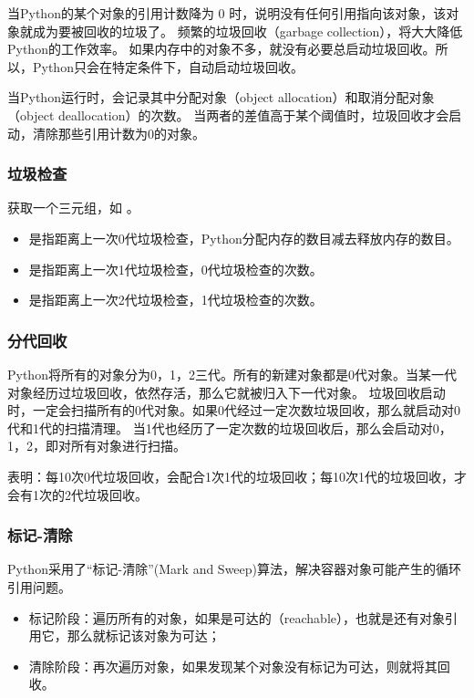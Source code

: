 \documentclass[letterpaper,10pt,english]{sphinxmanual}
\begin{document}
当Python的某个对象的引用计数降为 0 时，说明没有任何引用指向该对象，该对象就成为要被回收的垃圾了。
频繁的垃圾回收（garbage collection），将大大降低Python的工作效率。
如果内存中的对象不多，就没有必要总启动垃圾回收。所以，Python只会在特定条件下，自动启动垃圾回收。

当Python运行时，会记录其中分配对象（object allocation）和取消分配对象（object deallocation）的次数。
当两者的差值高于某个阈值时，垃圾回收才会启动，清除那些引用计数为0的对象。


\subsubsection{垃圾检查}
\label{\detokenize{python/15_memManage:id9}}
 获取一个三元组，如  。
\begin{itemize}
\item {} 
 是指距离上一次0代垃圾检查，Python分配内存的数目减去释放内存的数目。

\item {} 
 是指距离上一次1代垃圾检查，0代垃圾检查的次数。

\item {} 
 是指距离上一次2代垃圾检查，1代垃圾检查的次数。

\end{itemize}


\subsubsection{分代回收}
\label{\detokenize{python/15_memManage:id10}}
Python将所有的对象分为0，1，2三代。所有的新建对象都是0代对象。当某一代对象经历过垃圾回收，依然存活，那么它就被归入下一代对象。
垃圾回收启动时，一定会扫描所有的0代对象。如果0代经过一定次数垃圾回收，那么就启动对0代和1代的扫描清理。
当1代也经历了一定次数的垃圾回收后，那么会启动对0，1，2，即对所有对象进行扫描。

 表明：每10次0代垃圾回收，会配合1次1代的垃圾回收；每10次1代的垃圾回收，才会有1次的2代垃圾回收。


\subsubsection{标记-清除}
\label{\detokenize{python/15_memManage:id11}}
Python采用了“标记-清除”(Mark and Sweep)算法，解决容器对象可能产生的循环引用问题。
\begin{itemize}
\item {} 
标记阶段：遍历所有的对象，如果是可达的（reachable），也就是还有对象引用它，那么就标记该对象为可达；

\item {} 
清除阶段：再次遍历对象，如果发现某个对象没有标记为可达，则就将其回收。

\end{itemize}
\end{document}
